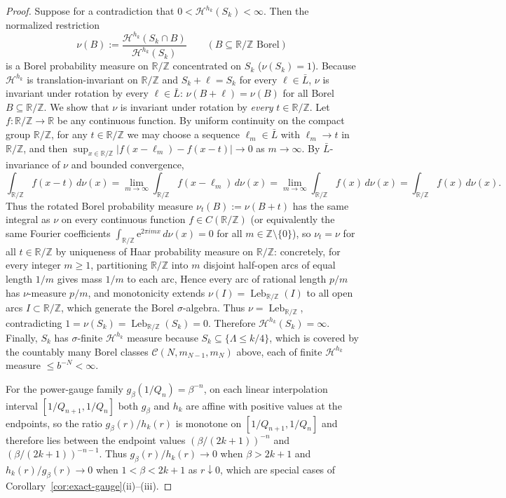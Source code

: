 \documentclass[11pt]{article}
\theoremstyle{definition}
\theoremstyle{remark}
\newcommand{\R}{\mathbb{R}}
\newcommand{\Z}{\mathbb{Z}}
\newcommand{\ee}{\mathrm{e}}
\newcommand{\Lam}{\Lambda}
\begin{document}
\begin{proof}
Suppose for a contradiction that $0<\mathcal H^{h_k}(S_k)<\infty$. Then the
normalized restriction
\[
\nu(B):=\frac{\mathcal H^{h_k}(S_k\cap B)}{\mathcal H^{h_k}(S_k)}
\qquad(B\subseteq\R/\Z\text{ Borel})
\]
is a Borel probability measure on $\R/\Z$ concentrated on $S_k$ ($\nu(S_k)=1$).
Because $\mathcal H^{h_k}$ is translation-invariant on $\R/\Z$ and $S_k+\ell=S_k$
for every $\ell\in\bar L$, $\nu$ is invariant under rotation by every
$\ell\in\bar L$: $\nu(B+\ell)=\nu(B)$ for all Borel $B\subseteq\R/\Z$. We show
that $\nu$ is invariant under rotation by \emph{every} $t\in\R/\Z$. Let
$f:\R/\Z\to\R$ be any continuous function. By uniform continuity on the compact
group $\R/\Z$, for any $t\in\R/\Z$ we may choose a sequence $\ell_m\in\bar L$
with $\ell_m\to t$ in $\R/\Z$, and then
$\sup_{x\in\R/\Z}|f(x-\ell_m)-f(x-t)|\to0$ as $m\to\infty$. By $\bar L$-invariance
of $\nu$ and bounded convergence,
\[
\int_{\R/\Z}f(x-t)\,d\nu(x)
=\lim_{m\to\infty}\int_{\R/\Z}f(x-\ell_m)\,d\nu(x)
=\lim_{m\to\infty}\int_{\R/\Z}f(x)\,d\nu(x)
=\int_{\R/\Z}f(x)\,d\nu(x).
\]
Thus the rotated Borel probability measure $\nu_t(B):=\nu(B+t)$ has the same
integral as $\nu$ on every continuous function $f\in C(\R/\Z)$ (or equivalently
the same Fourier coefficients $\int_{\R/\Z}\ee^{2\pi i m x}\,d\nu(x)=0$ for all
$m\in\Z\setminus\{0\}$), so $\nu_t=\nu$ for all $t\in\R/\Z$ by uniqueness of
Haar probability measure on $\R/\Z$: concretely, for every integer $m\ge1$,
partitioning $\R/\Z$ into $m$ disjoint half-open arcs of equal length $1/m$
gives mass $1/m$ to each arc, Hence every arc of rational length $p/m$ has
$\nu$-measure $p/m$, and monotonicity extends $\nu(I)=\operatorname{Leb}_{\R/\Z}(I)$
to all open arcs $I\subset\R/\Z$, which generate the Borel $\sigma$-algebra.
Thus $\nu=\operatorname{Leb}_{\R/\Z}$, contradicting
$1=\nu(S_k)=\operatorname{Leb}_{\R/\Z}(S_k)=0$. Therefore
$\mathcal H^{h_k}(S_k)=\infty$. Finally, $S_k$ has $\sigma$-finite
$\mathcal H^{h_k}$ measure because $S_k\subseteq\{\Lam\le k/4\}$, which is
covered by the countably many Borel classes $\mathcal C(N,m_{N-1},m_N)$ above,
each of finite $\mathcal H^{h_k}$ measure $\le b^{-N}<\infty$.

For the power-gauge family $g_\beta(1/Q_n)=\beta^{-n}$, on each linear
interpolation interval $[1/Q_{n+1},1/Q_n]$ both $g_\beta$ and $h_k$ are affine
with positive values at the endpoints, so the ratio $g_\beta(r)/h_k(r)$ is
monotone on $[1/Q_{n+1},1/Q_n]$ and therefore lies between the endpoint values
$(\beta/(2k+1))^{-n}$ and $(\beta/(2k+1))^{-n-1}$. Thus
$g_\beta(r)/h_k(r)\to0$ when $\beta>2k+1$ and $h_k(r)/g_\beta(r)\to0$ when
$1<\beta<2k+1$ as $r\downarrow0$, which are special cases of
Corollary~\ref{cor:exact-gauge}(ii)--(iii).


\end{proof}
\end{document}
